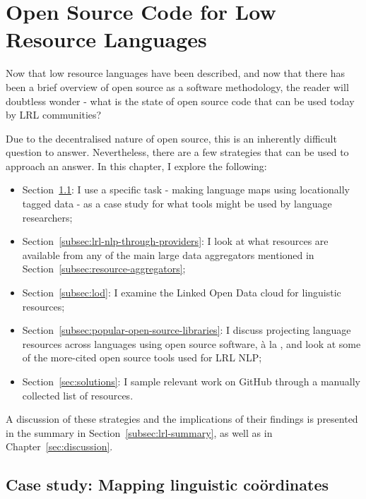 \section{Open Source Code for Low Resource Languages}
\label{sec:lrl-code}

Now that low resource languages have been described, and now that there has been a brief overview of open source as a software methodology, the reader will doubtless wonder - what is the state of open source code that can be used today by LRL communities?

Due to the decentralised nature of open source, this is an inherently difficult question to answer. Nevertheless, there are a few strategies that can be used to approach an answer. In this chapter, I explore the following:

\begin{itemize}
\item Section~\ref{subsec:mapping}: I use a specific task - making language maps using locationally tagged data -  as a case study for what tools might be used by language researchers;
\item Section~\ref{subsec:lrl-nlp-through-providers}: I look at what resources are available from any of the main large data aggregators mentioned in Section~\ref{subsec:resource-aggregators};
\item Section~\ref{subsec:lod}: I examine the Linked Open Data cloud for linguistic resources;
\item Section~\ref{subsec:popular-open-source-libraries}: I discuss projecting language resources across languages using open source software, \`a la \citet{bender2016linguistic}, and look at some of the more-cited open source tools used for LRL NLP;
\item Section~\ref{sec:solutions}: I sample relevant work on GitHub through a manually collected list of resources.
\end{itemize}

A discussion of these strategies and the implications of their findings is presented in the summary in Section~\ref{subsec:lrl-summary}, as well as in Chapter~\ref{sec:discussion}.

\subsection{Case study: Mapping linguistic co\"ordinates}
\label{subsec:mapping}

